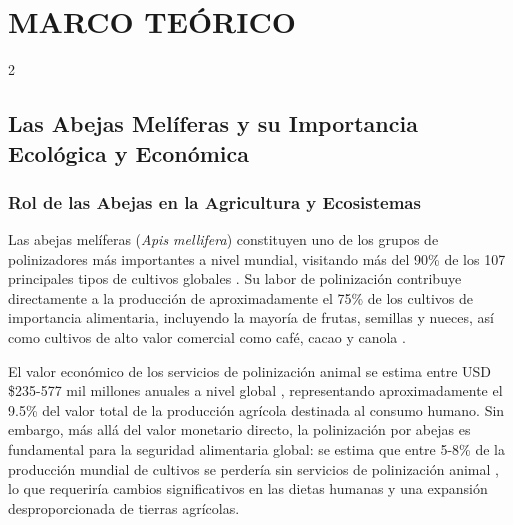 \documentclass[12pt]{report}
\newenvironment{tightmulticols}{%
  \begin{multicols}{2}
  \setlength{\parskip}{1.2pt}
  \linespread{1}\selectfont
}{%
  \end{multicols}
}
\begin{document}

\pagebreak
\chapter{MARCO TEÓRICO}
\vspace{-3em}

\begin{tightmulticols}


\section{Las Abejas Melíferas y su Importancia Ecológica y Económica}

\subsection{Rol de las Abejas en la Agricultura y Ecosistemas}

\noindent Las abejas melíferas (\textit{Apis mellifera}) constituyen uno de los grupos de polinizadores más importantes a nivel mundial, visitando más del 90\% de los 107 principales tipos de cultivos globales \cite{khalifa2021}. Su labor de polinización contribuye directamente a la producción de aproximadamente el 75\% de los cultivos de importancia alimentaria, incluyendo la mayoría de frutas, semillas y nueces, así como cultivos de alto valor comercial como café, cacao y canola \cite{potts2016}.

\par El valor económico de los servicios de polinización animal se estima entre USD \$235-577 mil millones anuales a nivel global \cite{potts2016}, representando aproximadamente el 9.5\% del valor total de la producción agrícola destinada al consumo humano. Sin embargo, más allá del valor monetario directo, la polinización por abejas es fundamental para la seguridad alimentaria global: se estima que entre 5-8\% de la producción mundial de cultivos se perdería sin servicios de polinización animal \cite{khalifa2021}, lo que requeriría cambios significativos en las dietas humanas y una expansión desproporcionada de tierras agrícolas.


\end{tightmulticols}
\end{document}
